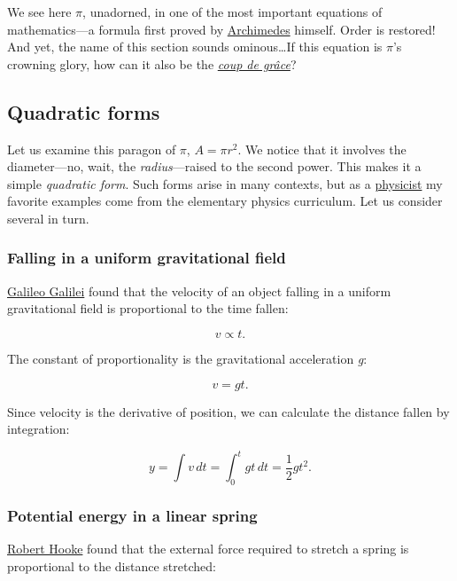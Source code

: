 \documentclass{article}
\begin{document}
\noindent We see here $\pi$, unadorned, in one of the most important equations of mathematics---a formula first proved by \href{Archimedes}{Archimedes} himself. Order is restored! And yet, the name of this section sounds ominous\ldots If this equation is $\pi$'s crowning glory, how can it also be the \href{http://en.wikipedia.org/wiki/Coup_de_grace}{\emph{coup de gr\^{a}ce}}?


  \subsection{Quadratic forms} %
  \label{sec:quadratic_forms}

Let us examine this paragon of $\pi$, $A = \pi r^2$. We notice that it involves the diameter---no, wait, the \emph{radius}---raised to the second power. This makes it a simple \emph{quadratic form}. Such forms arise in many contexts, but as a \href{http://thesis.library.caltech.edu/1940/}{physicist} my favorite examples come from the elementary physics curriculum. Let us consider several in turn.

    \subsubsection{Falling in a uniform gravitational field} %
    \label{sec:falling_in_a_uniform_gravitational_field}

\href{http://en.wikipedia.org/wiki/Galileo_Galilei}{Galileo Galilei} found that the velocity of an object falling in a uniform gravitational field is proportional to the time fallen:

\[ v \propto t. \]

\noindent The constant of proportionality is the gravitational acceleration \emph{g}:

\[ v = g t. \]

\noindent Since velocity is the derivative of position, we can calculate the distance fallen by integration:

\[ y = \int v\,dt = \int_0^t gt\,dt = \textstyle{\frac{1}{2}} gt^2. \]


    \subsubsection{Potential energy in a linear spring} %
    \label{sec:potential_energy_in_a_linear_spring}

\href{http://en.wikipedia.org/wiki/Robert_Hooke}{Robert Hooke} found that the external force required to stretch a spring is proportional to the distance stretched:
\end{document}
